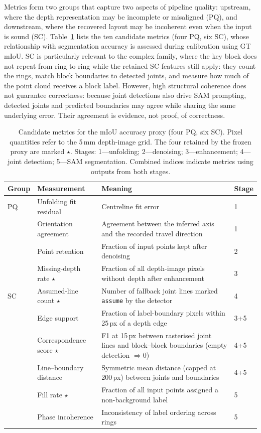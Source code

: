 \documentclass[a4paper,fleqn]{cas-dc}
\begin{document}
Metrics form two groups that capture two aspects of pipeline quality: upstream, where the depth representation may be incomplete or misaligned (PQ), and downstream, where the recovered layout may be incoherent even when the input is sound (SC). Table~\ref{tab:candidate-features} lists the ten candidate metrics (four PQ, six SC), whose relationship with segmentation accuracy is assessed during calibration using GT mIoU. SC is particularly relevant to the complex family, where the key block does not repeat from ring to ring while the retained SC features still apply: they count the rings, match block boundaries to detected joints, and measure how much of the point cloud receives a block label. However, high structural coherence does not guarantee correctness: because joint detections also drive SAM prompting, detected joints and predicted boundaries may agree while sharing the same underlying error. Their agreement is evidence, not proof, of correctness.

\begin{table}[t]
\caption{Candidate metrics for the mIoU accuracy proxy (four PQ, six SC). Pixel quantities refer to the 5\,mm depth-image grid. The four retained by the frozen proxy are marked $\star$. Stages: 1---unfolding; 2---denoising; 3---enhancement; 4---joint detection; 5---SAM segmentation. Combined indices indicate metrics using outputs from both stages.}
\label{tab:candidate-features}
\centering
\small
\setlength{\tabcolsep}{3pt}
\begin{tabular}{p{} p{} p{} p{}}
\toprule
Group & Measurement & Meaning & Stage \\
\midrule
PQ & Unfolding fit residual & Centreline fit error & 1 \\
 & Orientation agreement & Agreement between the inferred axis and the recorded travel direction & 1 \\
 & Point retention & Fraction of input points kept after denoising & 2 \\
 & Missing-depth rate $\star$ & Fraction of all depth-image pixels without depth after enhancement & 3 \\
\rowcolor{yellow!25}SC & Assumed-line count $\star$ & Number of fallback joint lines marked \texttt{assume} by the detector & 4 \\
 & Edge support & Fraction of label-boundary pixels within 25\,px of a depth edge & 3+5 \\
 & Correspondence score $\star$ & F1 at 15\,px between rasterised joint lines and block--block boundaries (empty detection $\Rightarrow 0$) & 4+5 \\
 & Line--boundary distance & Symmetric mean distance (capped at 200\,px) between joints and boundaries & 4+5 \\
 & Fill rate $\star$ & Fraction of all input points assigned a non-background label & 5 \\
 & Phase incoherence & Inconsistency of label ordering across rings & 5 \\
\bottomrule
\end{tabular}
\end{table}
\end{document}
